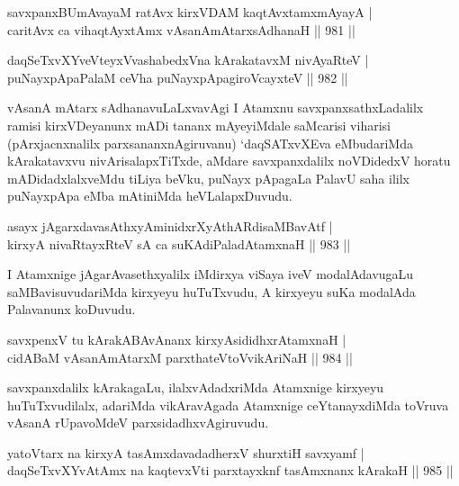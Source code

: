 
\begin{shl}
savxpanxBUmAvayaM ratAvx kirxVDAM kaqtAvx\s \s tamxmAyayA | \\
caritAvx ca vihaqtAyx\s \s tAmx vAsanAmAtarxsAdhanaH \hfill||  981 ||  
\end{shl}
				
\begin{shl}
daqSeTxvXYveVteyxVvashabedxVna kArakatavxM nivAyaRteV | \\
puNayxpApaPalaM ceVha puNayxpApagiroVcayxteV \hfill||  982 ||  
\end{shl}

\begin{artha}
vAsanA mAtarx sAdhanavuLaLxvavAgi I Atamxnu savxpanxsathxLadalilx ramisi kirxVDeyanunx mADi tananx mAyeyiMdale saMcarisi viharisi (pArxjacnxnalilx parxsananxnAgiruvanu) `daqSATxvXEva eMbudariMda kArakatavxvu nivArisalapxTiTxde, aMdare savxpanxdalilx noVDidedxV horatu mADidadxlalxveMdu tiLiya beVku, puNayx pApagaLa PalavU saha ililx puNayxpApa eMba mAtiniMda heVLalapxDuvudu.
\end{artha}

\begin{shl}
asayx jAgarxdavasAthxyAminidxrXyAthARdisaMBavAtf | \\
kirxyA nivaRtayxRteV sA ca suKAdiPaladA\s \s tamxnaH \hfill||  983 ||  
\end{shl}

\begin{artha}
I Atamxnige jAgarAvasethxyalilx iMdirxya viSaya iveV modalAdavugaLu saMBavisuvudariMda kirxyeyu huTuTxvudu, A kirxyeyu suKa modalAda Palavanunx koDuvudu.
\end{artha}

\begin{shl}
savxpenxV tu kArakABAvAnanx kirxyAsididhxrAtamxnaH | \\
cidABaM vAsanAmAtarxM parxthateV\s toV\s vikAriNaH \hfill||  984 ||  
\end{shl}

\begin{artha}
savxpanxdalilx kArakagaLu, ilalxvAdadxriMda Atamxnige kirxyeyu huTuTxvudilalx, adariMda vikAravAgada Atamxnige ceYtanayxdiMda toVruva vAsanA rUpavoMdeV parxsidadhxvAgiruvudu.
\end{artha}


\begin{shl}
yatoV\s tarx na kirxyA tasAmxdavadadherxV shurxtiH savxyamf | \\
daqSeTxvXYvA\s \s tAmx na kaqtevxVti parxtayxknf tasAmxnanx kArakaH \hfill||  985 ||  
\end{shl}

